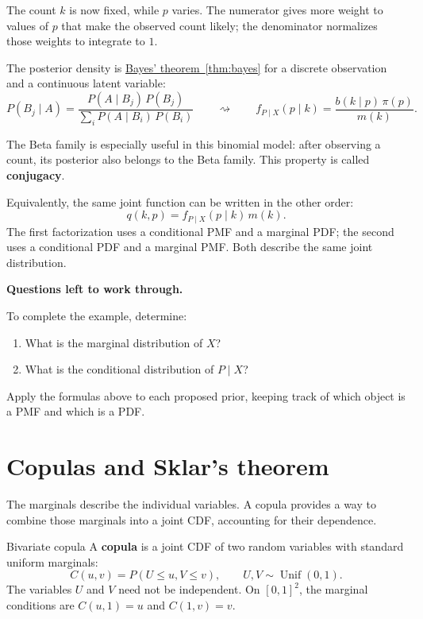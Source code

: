 \documentclass[a4paper,12pt,oneside]{report}
\newcommand{\exerciseheading}[1]{%
  \par\Needspace{5\baselineskip}\noindent\textbf{#1}\par\nobreak}
\begin{document}
The count $k$ is now fixed, while $p$ varies. The numerator gives
more weight to values of $p$ that make the observed count likely;
the denominator normalizes those weights to integrate to $1$.

\begin{notebox}
The posterior density is
\hyperref[thm:bayes]{Bayes' theorem~\ref{thm:bayes}} for a discrete
observation and a continuous latent variable:
\[
  P(B_j\mid A)=\frac{P(A\mid B_j)\,P(B_j)}{\sum_i P(A\mid B_i)\,P(B_i)}
  \qquad\rightsquigarrow\qquad
  f_{P\mid X}(p\mid k)=\frac{b(k\mid p)\,\pi(p)}{m(k)}.
\]
\end{notebox}

The Beta family is especially useful in this binomial model:
after observing a count, its posterior also belongs to the Beta
family. This property is called \textbf{conjugacy}.


Equivalently, the same joint function can be written in the other
order:
\[
  q(k,p)=f_{P\mid X}(p\mid k)\,m(k).
\]
The first factorization uses a conditional PMF and a marginal PDF;
the second uses a conditional PDF and a marginal PMF. Both describe
the same joint distribution.

\exerciseheading{Questions left to work through.}
To complete the example, determine:
\begin{enumerate}
  \item What is the marginal distribution of $X$?
  \item What is the conditional distribution of $P\mid X$?
\end{enumerate}
Apply the formulas above to each proposed prior, keeping track of
which object is a PMF and which is a PDF.


\section{Copulas and Sklar's theorem}
\label{sec:copulas}

The marginals describe the individual variables. A copula
provides a way to combine those marginals into a joint CDF,
accounting for their dependence.

\begin{frameddefn}{Bivariate copula}
A \textbf{copula} is a joint CDF of two random variables with
standard uniform marginals:
\[
  C(u,v)=P(U\leq u,V\leq v),
  \qquad U,V\sim\operatorname{Unif}(0,1).
\]
The variables $U$ and $V$ need not be independent. On $[0,1]^2$,
the marginal conditions are $C(u,1)=u$ and $C(1,v)=v$.
\end{frameddefn}
\end{document}
